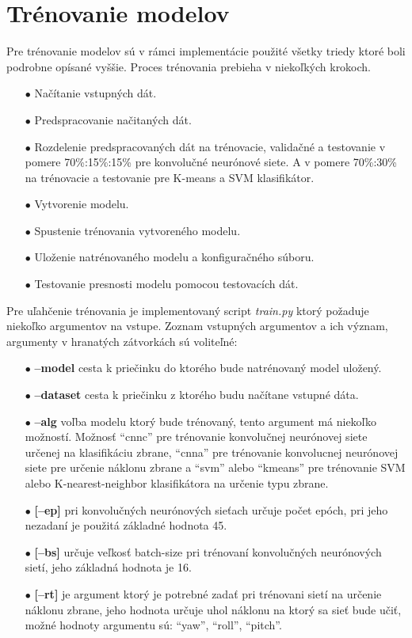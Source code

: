 
\section{Trénovanie modelov}
\label{sec:trenovanie}
Pre trénovanie modelov sú v rámci implementácie použité všetky triedy ktoré boli podrobne opísané vyššie.
Proces trénovania prebieha v niekoľkých krokoch.
\begin{enumerate}
    \item[$\bullet$] Načítanie vstupných dát.
    \item[$\bullet$] Predspracovanie načitaných dát.
    \item[$\bullet$] Rozdelenie predspracovaných dát na trénovacie, validačné a testovanie v pomere 70\%:15\%:15\% pre konvolučné neurónové siete.
    A v pomere 70\%:30\% na trénovacie a testovanie pre K-means a SVM klasifikátor.
    \item[$\bullet$] Vytvorenie modelu.
    \item[$\bullet$] Spustenie trénovania vytvoreného modelu.
    \item[$\bullet$] Uloženie natrénovaného modelu a konfiguračného súboru.
    \item[$\bullet$] Testovanie presnosti modelu pomocou testovacích dát.
\end{enumerate}

Pre uľahčenie trénovania je implementovaný script \textit{train.py} ktorý požaduje niekoľko argumentov na vstupe.
Zoznam vstupných argumentov a ich význam, argumenty v hranatých zátvorkách sú voliteľné:
\begin{enumerate}
  \item[$\bullet$] \textbf{--model} cesta k priečinku do ktorého bude natrénovaný model uložený.
  \item[$\bullet$] \textbf{--dataset} cesta k priečinku z ktorého budu načítane vstupné dáta.
  \item[$\bullet$] \textbf{--alg} voľba modelu ktorý bude trénovaný, tento argument má niekoľko možností.
  Možnosť ``cnnc'' pre trénovanie konvolučnej neurónovej siete určenej na klasifikáciu zbrane,
  ``cnna'' pre trénovanie konvolucnej neurónovej siete pre určenie náklonu zbrane a
  ``svm'' alebo ``kmeans'' pre trénovanie SVM alebo K-nearest-neighbor klasifikátora na určenie typu zbrane.
  \item[$\bullet$] \textbf{[--ep]} pri konvolučných neurónových sieťach určuje počet epóch, pri jeho nezadaní je použitá
  základné hodnota 45.
  \item[$\bullet$] \textbf{[--bs]} určuje veľkosť batch-size pri trénovaní konvolučných neurónových sietí, jeho
  základná hodnota je 16.
  \item[$\bullet$] \textbf{[--rt]} je argument ktorý je potrebné zadať pri trénovani sietí na určenie náklonu zbrane,
  jeho hodnota určuje uhol náklonu na ktorý sa sieť bude učiť, možné hodnoty argumentu sú: ``yaw'', ``roll'', ``pitch''.
\end{enumerate}

